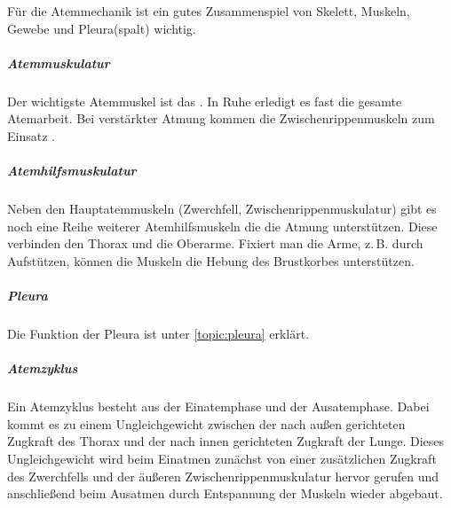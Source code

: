 {
Für die Atemmechanik ist ein gutes Zusammenspiel von
Skelett, Muskeln, Gewebe und Pleura(spalt) wichtig.


\subparagraph{Atemmuskulatur} Der wichtigste Atemmuskel ist
das . In Ruhe erledigt es
fast die gesamte Atemarbeit. Bei verstärkter Atmung kommen die
Zwischenrippenmuskeln zum Einsatz \cite{LippertAnatomie7}.


\subparagraph{Atemhilfsmuskulatur}%
\label{topic:atemhilfsmuskulatur}%
%
Neben den Hauptatemmuskeln (Zwerchfell,
Zwischenrippenmuskulatur) gibt es noch eine Reihe weiterer
Atemhilfsmuskeln die die Atmung unterstützen. Diese
verbinden den Thorax und die Oberarme. Fixiert man die Arme,
z.\,B. durch Aufstützen, können die Muskeln die Hebung des
Brustkorbes unterstützen.

\subparagraph{Pleura} Die Funktion der Pleura ist unter \ref{topic:pleura}
erklärt. 


% 


\subparagraph{Atemzyklus}
Ein Atemzyklus besteht aus der Einatemphase und der
Ausatemphase. Dabei kommt es zu einem Ungleichgewicht
zwischen der nach außen gerichteten Zugkraft des Thorax und
der nach innen gerichteten Zugkraft der Lunge. Dieses
Ungleichgewicht wird beim Einatmen zunächst von einer
zusätzlichen Zugkraft des Zwerchfells und der äußeren
Zwischenrippenmuskulatur hervor gerufen und anschließend
beim Ausatmen durch Entspannung der Muskeln wieder abgebaut.

}
